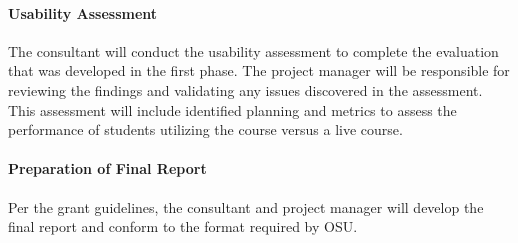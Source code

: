 \paragraph{Usability Assessment} The consultant will conduct the usability
  assessment to complete the evaluation that was developed in the
  first phase.  The project manager will be responsible for reviewing
  the findings and validating any issues discovered in the assessment.
  This assessment will include identified planning and metrics to
  assess the performance of students utilizing the course versus a
  live course.
\paragraph{Preparation of Final Report} Per the grant guidelines, the
  consultant and project manager will develop the final report and
  conform to the format required by OSU.

